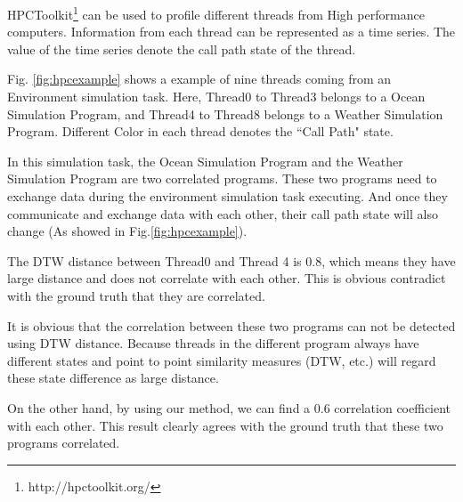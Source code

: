 
HPCToolkit\footnote{http://hpctoolkit.org/} can be used to profile different threads from High performance computers.
Information from each thread can be represented as a time series. The value of the time series denote the call path \cite{adhianto2010hpctoolkit} state of the thread.


Fig. \ref{fig:hpcexample} shows a example of nine threads coming from an Environment simulation task. Here, Thread0 to Thread3 belongs to a Ocean Simulation Program, and Thread4 to Thread8 belongs to a Weather Simulation Program. Different Color in each thread denotes the ``Call Path" state.

In this simulation task, the Ocean Simulation Program and the Weather Simulation Program are two correlated programs.
These two programs need to exchange data during the environment simulation task executing. 
And once they communicate and exchange data with each other, their call path state will also change (As showed in Fig.\ref{fig:hpcexample}).

The DTW distance between Thread0 and Thread 4 is $0.8$, which means they have large distance and does not correlate with each other. This is obvious contradict with the ground truth that they are correlated.

It is obvious that the correlation between these two programs can not be detected using DTW distance. Because threads in the different program always have different states and point to point similarity measures (DTW, etc.) will regard these state difference as large distance.

On the other hand, by using our method, we can find a $0.6$ correlation coefficient with each other. This result clearly agrees with the ground truth that these two programs correlated.


